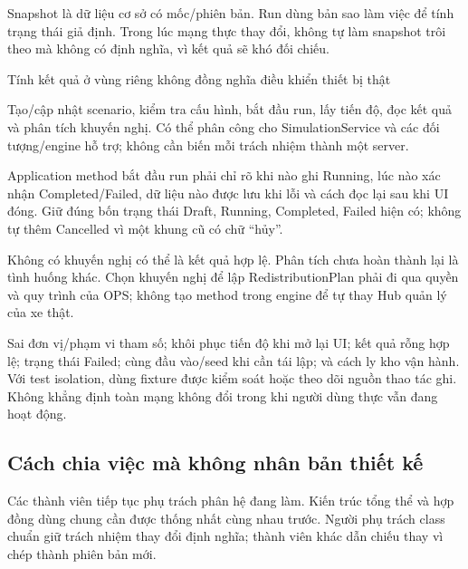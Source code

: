 Snapshot là dữ liệu cơ sở có mốc/phiên bản. Run dùng bản sao làm việc để tính trạng thái giả định. Trong lúc mạng thực thay đổi, không tự làm snapshot trôi theo mà không có định nghĩa, vì kết quả sẽ khó đối chiếu.

  {Tính kết quả ở vùng riêng không đồng nghĩa điều khiển thiết bị thật}

Tạo/cập nhật scenario, kiểm tra cấu hình, bắt đầu run, lấy tiến độ, đọc kết quả và phân tích khuyến nghị. Có thể phân công cho SimulationService và các đối tượng/engine hỗ trợ; không cần biến mỗi trách nhiệm thành một server.

Application method bắt đầu run phải chỉ rõ khi nào ghi Running, lúc nào xác nhận Completed/Failed, dữ liệu nào được lưu khi lỗi và cách đọc lại sau khi UI đóng. Giữ đúng bốn trạng thái Draft, Running, Completed, Failed hiện có; không tự thêm Cancelled vì một khung cũ có chữ ``hủy''.

Không có khuyến nghị có thể là kết quả hợp lệ. Phân tích chưa hoàn thành lại là tình huống khác. Chọn khuyến nghị để lập RedistributionPlan phải đi qua quyền và quy trình của OPS; không tạo method trong engine để tự thay Hub quản lý của xe thật.

Sai đơn vị/phạm vi tham số; khôi phục tiến độ khi mở lại UI; kết quả rỗng hợp lệ; trạng thái Failed; cùng đầu vào/seed khi cần tái lập; và cách ly kho vận hành. Với test isolation, dùng fixture được kiểm soát hoặc theo dõi nguồn thao tác ghi. Không khẳng định toàn mạng không đổi trong khi người dùng thực vẫn đang hoạt động.

\subsection{Cách chia việc mà không nhân bản thiết kế}
Các thành viên tiếp tục phụ trách phân hệ đang làm. Kiến trúc tổng thể và hợp đồng dùng chung cần được thống nhất cùng nhau trước. Người phụ trách class chuẩn giữ trách nhiệm thay đổi định nghĩa; thành viên khác dẫn chiếu thay vì chép thành phiên bản mới.

